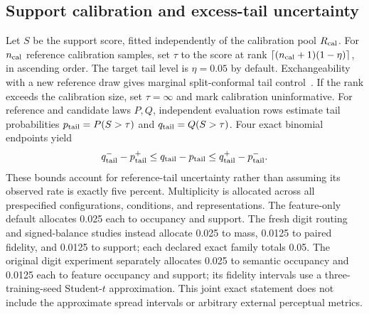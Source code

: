 \subsection{Support calibration and excess-tail uncertainty}
Let $S$ be the support score, fitted independently of the calibration
pool $R_{\rm cal}$. For $n_{\rm cal}$ reference calibration samples,
set $\tau$ to the score at rank $\lceil(n_{\rm cal}+1)(1-\eta)\rceil$,
in ascending order. The target tail level is $\eta=0.05$ by default.
Exchangeability with a new reference draw gives marginal split-conformal
tail control~\cite{vovk2013conditional}. If the rank exceeds the
calibration size, set $\tau=\infty$ and mark calibration uninformative.
For reference and candidate laws $P,Q$, independent evaluation rows
estimate tail probabilities $p_{\rm tail}=P(S>\tau)$ and
$q_{\rm tail}=Q(S>\tau)$.
Four exact binomial endpoints yield
\begin{equation}
q_{\rm tail}^- - p_{\rm tail}^+
\leq q_{\rm tail}-p_{\rm tail}
\leq q_{\rm tail}^+-p_{\rm tail}^-.
\label{eq:supp_tail_excess}
\end{equation}
These bounds account for reference-tail uncertainty rather than assuming its
observed rate is exactly five percent. Multiplicity is allocated across all
prespecified configurations, conditions, and representations. The feature-only
default allocates 0.025 each to occupancy and support. The fresh digit
routing and signed-balance studies instead allocate 0.025 to mass, 0.0125
to paired fidelity, and 0.0125 to support; each declared exact family totals
0.05. The original digit experiment separately allocates 0.025 to semantic
occupancy and 0.0125 each to feature occupancy and support; its fidelity
intervals use a three-training-seed Student-$t$ approximation.
This joint exact statement does not include the approximate spread intervals
or arbitrary external perceptual metrics.

